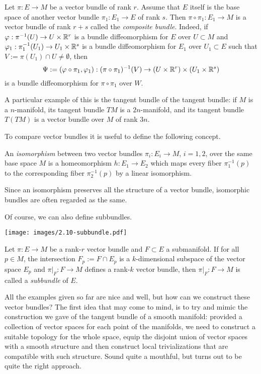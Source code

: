 \begin{example}
  Let $\pi:E \to M$ be a vector bundle of rank $r$.
  Assume that $E$ itself is the base space of another vector bundle $\pi_1: E_1\to E$ of rank $s$.
  Then $\pi\circ\pi_1: E_1 \to M$ is a vector bundle of rank $r+s$ called the \emph{composite bundle}. Indeed, if $\varphi:\pi^{-1}(U)\to U\times\mathbb{R}^r$ is a bundle diffeomorphism for $E$ over $U\subset M$ and $\varphi_1:\pi_1^{-1}(U_1)\to U_1\times\mathbb{R}^s$ is a bundle diffeomorphism for $E_1$ over $U_1\subset E$ such that $V := \pi(U_1)\cap U\neq \emptyset$, then
  \begin{equation}
    \Psi:=(\varphi\circ\pi_1, \varphi_1): (\pi\circ\pi_1)^{-1}(V)\to (U\times\mathbb{R}^r)\times (U_1\times\mathbb{R}^s)
  \end{equation}
  is a bundle diffeomorphism for $\pi\circ\pi_1$ over $W$.

  A particular example of this is the tangent bundle of the tangent bundle: if $M$ is a $n$-manifold, its tangent bundle $TM$ is a $2n$-manifold, and its tangent bundle $T(TM)$ is a vector bundle over $M$ of rank $3n$.
\end{example}

To compare vector bundles it is useful to define the following concept.
\begin{definition}
  An \emph{isomorphism} between two vector bundles $\pi_i: E_i \to M$, $i=1,2$, over the same base space $M$ is a homeomorphism $h:E_1 \to E_2$ which maps every fiber $\pi_1^{-1}(p)$ to the corresponding fiber $\pi_2^{-1}(p)$ by a linear isomorphism.
\end{definition}

Since an isomorphism preserves all the structure of a vector bundle, isomorphic bundles are often regarded as the same.

Of course, we can also define subbundles.
%
\begin{marginfigure}[4cm]
  \texttt{[image: images/2.10-subbundle.pdf]}
\end{marginfigure}
%
\begin{definition}
  Let $\pi:E \to M$ be a rank-$r$ vector bundle and $F\subset E$ a submanifold.
  If for all $p\in M$, the intersection $F_p := F\cap E_p$ is a $k$-dimensional subspace of the vector space $E_p$ and $\pi|_F : F \to M$ defines a rank-$k$ vector bundle, then $\pi|_F: F \to M$ is called a \emph{subbundle} of $E$.
\end{definition}

All the examples given so far are nice and well, but how can we construct these vector bundles?
The first idea that may come to mind, is to  try and mimic the construction we gave of the tangent bundle of a smooth manifold: provided a collection of vector spaces for each point of the manifolds, we need to construct a suitable topology for the whole space, equip the disjoint union of vector spaces with a smooth structure and then construct local trivializations that are compatible with such structure.
Sound quite a mouthful, but turns out to be quite the right approach.

